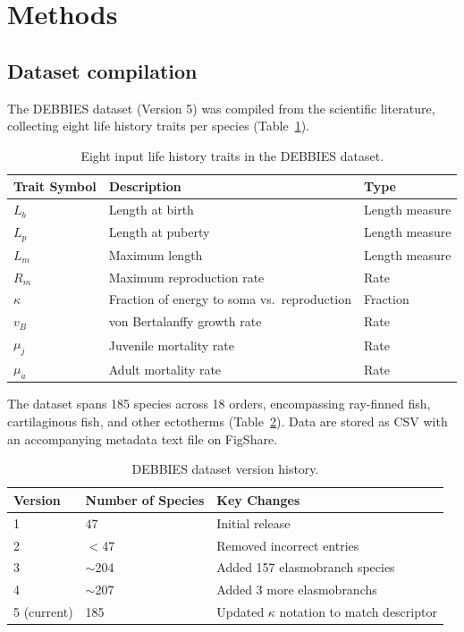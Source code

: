 \documentclass[11pt]{article}
\begin{document}
\section{Methods}

\subsection{Dataset compilation}

The DEBBIES dataset (Version 5) was compiled from the scientific literature, collecting eight life history traits per species (Table~\ref{tab:traits}).

\begin{table}[ht]
\centering
\caption{Eight input life history traits in the DEBBIES dataset.}
\label{tab:traits}
\begin{tabular}{lll}
\toprule
Trait Symbol & Description & Type \\
\midrule
$L_b$ & Length at birth & Length measure \\
$L_p$ & Length at puberty & Length measure \\
$L_m$ & Maximum length & Length measure \\
$R_m$ & Maximum reproduction rate & Rate \\
$\kappa$ & Fraction of energy to soma vs.\ reproduction & Fraction \\
$v_B$ & von Bertalanffy growth rate & Rate \\
$\mu_j$ & Juvenile mortality rate & Rate \\
$\mu_a$ & Adult mortality rate & Rate \\
\bottomrule
\end{tabular}
\end{table}

The dataset spans 185 species across 18 orders, encompassing ray-finned fish, cartilaginous fish, and other ectotherms (Table~\ref{tab:versions}). Data are stored as CSV with an accompanying metadata text file on FigShare.

\begin{table}[ht]
\centering
\caption{DEBBIES dataset version history.}
\label{tab:versions}
\begin{tabular}{lll}
\toprule
Version & Number of Species & Key Changes \\
\midrule
1 & 47 & Initial release \\
2 & $<$47 & Removed incorrect entries \\
3 & $\sim$204 & Added 157 elasmobranch species \\
4 & $\sim$207 & Added 3 more elasmobranchs \\
5 (current) & 185 & Updated $\kappa$ notation to match descriptor \\
\bottomrule
\end{tabular}
\end{table}
\end{document}
